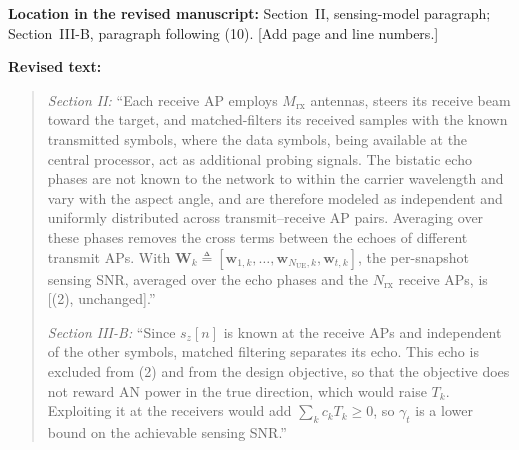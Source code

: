 \documentclass[a4paper,12pt]{article}
\newcommand{\revisionlocation}[1]{\par\textbf{Location in the revised manuscript:} #1\par}
\newenvironment{revisedtext}{%
  \par\textbf{Revised text:}\begin{quote}\color{red}
}{\end{quote}}
\begin{document}
\revisionlocation{Section~II, sensing-model paragraph; Section~III-B,
paragraph following (10). [Add page and line numbers.]}
\begin{revisedtext}
\textit{Section II:} ``Each receive AP employs $M_{\mathrm{rx}}$ antennas,
steers its receive beam toward the target, and matched-filters its received
samples with the known transmitted symbols, where the data symbols, being
available at the central processor, act as additional probing signals. The
bistatic echo phases are not known to the network to within the carrier
wavelength and vary with the aspect angle, and are therefore modeled as
independent and uniformly distributed across transmit--receive AP pairs.
Averaging over these phases removes the cross terms between the echoes of
different transmit APs. With
$\mathbf{W}_k\triangleq[\mathbf{w}_{1,k},\ldots,\mathbf{w}_{N_{\mathrm{UE}},k},\mathbf{w}_{t,k}]$,
the per-snapshot sensing SNR, averaged over the echo phases and the
$N_{\mathrm{rx}}$ receive APs, is [(2), unchanged].''

\textit{Section III-B:} ``Since $s_z[n]$ is known at the receive APs and
independent of the other symbols, matched filtering separates its echo. This
echo is excluded from (2) and from the design objective, so that the
objective does not reward AN power in the true direction, which would raise
$T_k$. Exploiting it at the receivers would add $\sum_kc_kT_k\ge0$, so
$\gamma_t$ is a lower bound on the achievable sensing SNR.''
\end{revisedtext}
\end{document}
